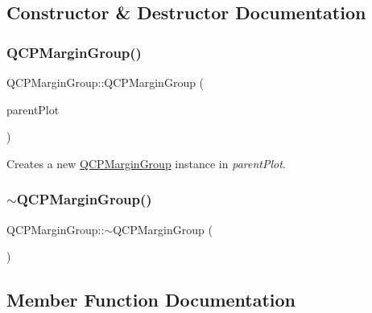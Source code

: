 \subsection{Constructor \& Destructor Documentation}
\mbox{\label{class_q_c_p_margin_group_ac481c20678ec5b305d6df330715f4b7b}} 
\subsubsection{\texorpdfstring{QCPMarginGroup()}{QCPMarginGroup()}}
{\footnotesize\ttfamily Q\+C\+P\+Margin\+Group\+::\+Q\+C\+P\+Margin\+Group (\begin{DoxyParamCaption}\item[{\mbox{\hyperlink{class_q_custom_plot}{Q\+Custom\+Plot}} $\ast$}]{parent\+Plot }\end{DoxyParamCaption})\hspace{0.3cm}{\ttfamily [explicit]}}

Creates a new \mbox{\hyperlink{class_q_c_p_margin_group}{Q\+C\+P\+Margin\+Group}} instance in {\itshape parent\+Plot}. \mbox{\label{class_q_c_p_margin_group_a42c62becdaac41406ca90f1c2a755e1c}} 
\subsubsection{\texorpdfstring{$\sim$QCPMarginGroup()}{~QCPMarginGroup()}}
{\footnotesize\ttfamily Q\+C\+P\+Margin\+Group\+::$\sim$\+Q\+C\+P\+Margin\+Group (\begin{DoxyParamCaption}{ }\end{DoxyParamCaption})\hspace{0.3cm}{\ttfamily [virtual]}}



\subsection{Member Function Documentation}
\mbox{\label{class_q_c_p_margin_group_acb9c3a35acec655c2895b7eb95ee0524}} 
